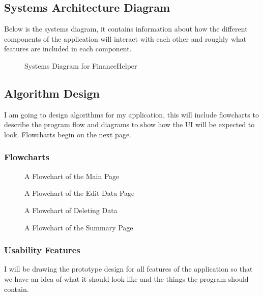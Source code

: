 \documentclass{article}
\begin{document}
\subsection{Systems Architecture Diagram}
Below is the systems diagram, it contains information about how the different components of the application will interact with each other and roughly what features are included in each component.
\begin{figure}[H]
    \centering
    
    \caption{Systems Diagram for FinanceHelper}
    \label{fig:SystemsDiagram}
\end{figure}

\subsection{Algorithm Design}
I am going to design algorithms for my application, this will include flowcharts to describe the program flow and diagrams to show how the UI will be expected to look. Flowcharts begin on the next page.

\subsubsection{Flowcharts}
\begin{figure}[H]
    \centering
    
    \caption{A Flowchart of the Main Page}
    \label{fig:MainPage}
\end{figure}

\begin{figure}[H]
    \centering
    
    \caption{A Flowchart of the Edit Data Page}
    \label{fig:DataPage}
\end{figure}

\begin{figure}[H]
    \centering
    
    \caption{A Flowchart of Deleting Data}
    \label{fig:Delete}
\end{figure}

\begin{figure}[H]
    \centering
    
    \caption{A Flowchart of the Summary Page}
    \label{fig:SummaryPage}
\end{figure}

\subsubsection{Usability Features}
I will be drawing the prototype design for all features of the application so that we have an idea of what it should look like and the things the program should contain.
\end{document}
